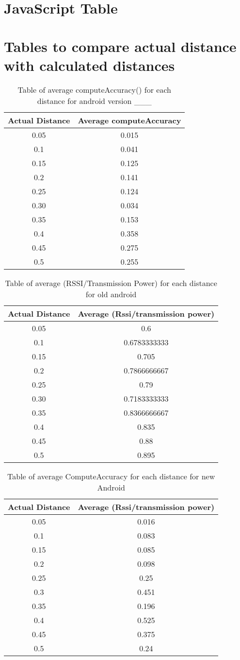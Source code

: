 \section{JavaScript Table}


\section{Tables to compare actual distance with calculated distances}
\begin{table}[H]
\label{tableOfComputeAccuracyOldAndroid}
\begin{tabular}{|c|c|}
\hline 
Actual Distance & Average computeAccuracy\tabularnewline
\hline 
\hline 
0.05 & 0.015\tabularnewline
\hline 
0.1 & 0.041\tabularnewline
\hline 
0.15 & 0.125\tabularnewline
\hline 
0.2 & 0.141\tabularnewline
\hline 
0.25 & 0.124\tabularnewline
\hline 
0.30 & 0.034\tabularnewline
\hline 
0.35 & 0.153\tabularnewline
\hline 
0.4 & 0.358\tabularnewline
\hline 
0.45 & 0.275\tabularnewline
\hline 
0.5 & 0.255\tabularnewline
\hline 
\end{tabular}

\protect\caption{Table of average computeAccuracy() for each distance for android version
\_\_\_}
\end{table}


\begin{table}[H]
\label{tableOfRSSIOldAndroid}
\begin{tabular}{|c|c|}
\hline 
Actual Distance & Average (Rssi/transmission power)\tabularnewline
\hline 
\hline 
0.05 & 0.6\tabularnewline
\hline 
0.1 & 0.6783333333\tabularnewline
\hline 
0.15 & 0.705\tabularnewline
\hline 
0.2 & 0.7866666667\tabularnewline
\hline 
0.25 & 0.79\tabularnewline
\hline 
0.30 & 0.7183333333\tabularnewline
\hline 
0.35 & 0.8366666667\tabularnewline
\hline 
0.4 & 0.835\tabularnewline
\hline 
0.45 & 0.88\tabularnewline
\hline 
0.5 & 0.895\tabularnewline
\hline 
\end{tabular}

\protect\caption{Table of average (RSSI/Transmission Power) for each distance for old android}
\end{table}



\begin{table}[H]
\label{tableOfComputeAccuracyNewAndroid}
\begin{tabular}{|c|c|}
\hline 
Actual Distance & Average (Rssi/transmission power)\tabularnewline
\hline 
\hline 
0.05 & 0.016\tabularnewline
\hline 
0.1 & 0.083\tabularnewline
\hline 
0.15 & 0.085\tabularnewline
\hline 
0.2 & 0.098\tabularnewline
\hline 
0.25 & 0.25\tabularnewline
\hline 
0.3 & 0.451\tabularnewline
\hline 
0.35 & 0.196\tabularnewline
\hline 
0.4 & 0.525\tabularnewline
\hline 
0.45 & 0.375\tabularnewline
\hline 
0.5 & 0.24\tabularnewline
\hline 
\end{tabular}

\protect\caption{Table of average ComputeAccuracy for each distance for new Android}
\end{table}

